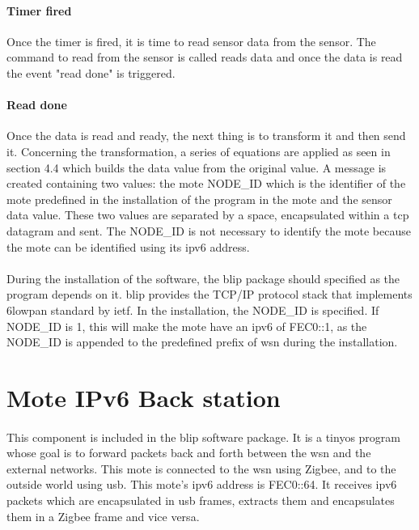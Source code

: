 \documentclass[oneside,12pt,a4paper,final]{book}
\begin{document}
\paragraph{Timer fired}
Once the timer is fired, it is time to read sensor data from the sensor. The command to read from the sensor is called reads data and once the data is read the event "read done" is triggered.
\paragraph{Read done}
Once the data is read and ready, the next thing is to transform it and then send it. Concerning the transformation, a series of equations are applied as seen in section 4.4 which builds the data value from the original value. A message is created containing two values: the mote NODE\_ID which is the identifier of the mote predefined in the installation of the program in the mote and the sensor data value. These two values are separated by a space, encapsulated within a \gls{tcp} datagram and sent. The NODE\_ID is not necessary to identify the mote because the mote can be identified using its \gls{ipv6} address.
\paragraph{}
During the installation of the software, the \gls{blip} package should specified as the program depends on it. \gls{blip} provides the TCP/IP protocol stack that implements \gls{6lowpan} standard by \gls{ietf}. In  the installation, the NODE\_ID is specified. If NODE\_ID is 1, this will make the mote have an \gls{ipv6} of FEC0::1, as the NODE\_ID is appended to the predefined prefix of \gls{wsn} during the installation.
\section{Mote IPv6 Back station}
\paragraph{}
This component is included in the \gls{blip} software package. It is a \gls{tinyos} program whose goal is to forward packets back and forth between the \gls{wsn} and the external networks. This mote is connected to the \gls{wsn} using Zigbee, and to the outside world using \gls{usb}. This mote's \gls{ipv6} address is FEC0::64. It receives \gls{ipv6} packets which are encapsulated in \gls{usb} frames, extracts them and encapsulates them in a Zigbee frame and vice versa.
\end{document}
